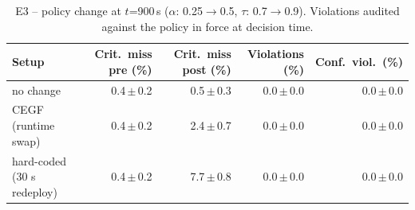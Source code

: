 \begin{table}[htbp]\scriptsize\centering
\caption{E3 -- policy change at $t$=900\,s ($\alpha$: 0.25$\to$0.5, $\tau$: 0.7$\to$0.9). Violations audited against the policy in force at decision time.}\label{tab:e3}
\begin{tabular}{lrrrr}
\toprule
Setup & Crit.\ miss pre (\%) & Crit.\ miss post (\%) & Violations (\%) & Conf.\ viol.\ (\%) \\
\midrule
no change & 0.4\,$\pm$\,0.2 & 0.5\,$\pm$\,0.3 & 0.0\,$\pm$\,0.0 & 0.0\,$\pm$\,0.0 \\
CEGF (runtime swap) & 0.4\,$\pm$\,0.2 & 2.4\,$\pm$\,0.7 & 0.0\,$\pm$\,0.0 & 0.0\,$\pm$\,0.0 \\
hard-coded (30 s redeploy) & 0.4\,$\pm$\,0.2 & 7.7\,$\pm$\,0.8 & 0.0\,$\pm$\,0.0 & 0.0\,$\pm$\,0.0 \\
\bottomrule
\end{tabular}
\end{table}